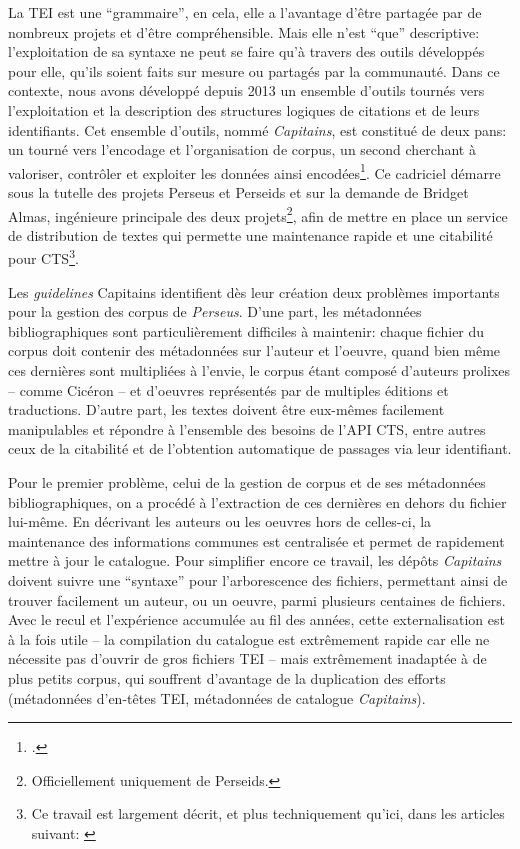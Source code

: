 La TEI est une \enquote{grammaire}, en cela, elle a l'avantage d'être partagée par de nombreux projets et d'être compréhensible. Mais elle n'est \enquote{que} descriptive: l'exploitation de sa syntaxe ne peut se faire qu'à travers des outils développés pour elle, qu'ils soient faits sur mesure ou partagés par la communauté. Dans ce contexte, nous avons développé depuis 2013 un ensemble d'outils tournés vers l'exploitation et la description des structures logiques de citations et de leurs identifiants. Cet ensemble d'outils, nommé \textit{Capitains}, est constitué de deux pans: un tourné vers l'encodage et l'organisation de corpus, un second cherchant à valoriser, contrôler et exploiter les données ainsi encodées\footcite{clerice_capitains_2015}. Ce cadriciel démarre sous la tutelle des projets Perseus et Perseids et sur la demande de Bridget Almas, ingénieure principale des deux projets\footnote{Officiellement uniquement de Perseids.}, afin de mettre en place un service de distribution de textes qui permette une maintenance rapide et une citabilité pour CTS\footnote{Ce travail est largement décrit, et plus techniquement qu'ici, dans les articles suivant: \textcite{almas_continuous_2018, clerice_les_2017}}. 

Les \textit{guidelines} Capitains identifient dès leur création deux problèmes importants pour la gestion des corpus de \textit{Perseus}. D'une part, les métadonnées bibliographiques sont particulièrement difficiles à maintenir: chaque fichier du corpus doit contenir des métadonnées sur l'auteur et l'oeuvre, quand bien même ces dernières sont multipliées à l'envie, le corpus étant composé d'auteurs prolixes -- comme Cicéron -- et d'oeuvres représentés par de multiples éditions et traductions.  D'autre part, les textes doivent être eux-mêmes facilement manipulables et répondre à l'ensemble des besoins de l'API CTS, entre autres ceux de la citabilité et de l'obtention automatique de passages via leur identifiant.

Pour le premier problème, celui de la gestion de corpus et de ses métadonnées bibliographiques, on a procédé à l'extraction de ces dernières en dehors du fichier lui-même. En décrivant les auteurs ou les oeuvres hors de celles-ci, la maintenance des informations communes est centralisée et permet de rapidement mettre à jour le catalogue. Pour simplifier encore ce travail, les dépôts \textit{Capitains} doivent suivre une \enquote{syntaxe} pour l'arborescence des fichiers, permettant ainsi de trouver facilement un auteur, ou un oeuvre, parmi plusieurs centaines de fichiers. Avec le recul et l'expérience accumulée au fil des années, cette externalisation est à la fois utile -- la compilation du catalogue est extrêmement rapide car elle ne nécessite pas d'ouvrir de gros fichiers TEI -- mais extrêmement inadaptée à de plus petits corpus, qui souffrent d'avantage de la duplication des efforts (métadonnées d'en-têtes TEI, métadonnées de catalogue \textit{Capitains}).

